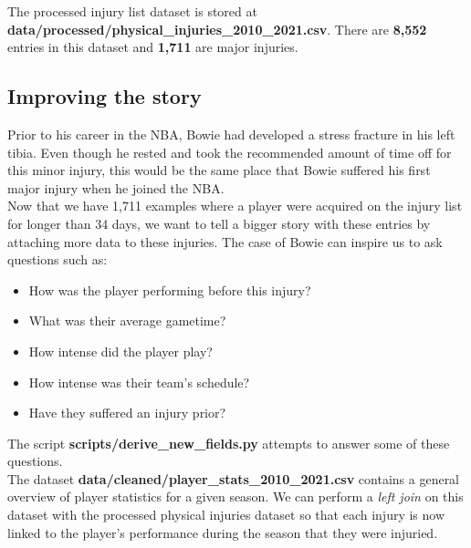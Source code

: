 \documentclass{article}
\begin{document}
The processed injury list dataset is stored at \textbf{data/processed/physical\_injuries\_2010\_2021.csv}.
There are \textbf{8,552} entries in this dataset and \textbf{1,711} are major injuries.

\subsection*{Improving the story}

Prior to his career in the NBA, Bowie had developed a stress fracture in his left tibia.
Even though he rested and took the recommended amount of time off for this minor injury,
this would be the same place that Bowie suffered his first major injury when he joined the NBA.\\

Now that we have 1,711 examples where a player were acquired on the injury list
for longer than 34 days, we want to tell a bigger story with these entries by attaching
more data to these injuries. The case of Bowie can inspire us to ask questions such as:

\begin{itemize}
    \item How was the player performing before this injury?
    \item What was their average gametime?
    \item How intense did the player play?
    \item How intense was their team's schedule?
    \item Have they suffered an injury prior?
\end{itemize}

The script \textbf{scripts/derive\_new\_fields.py} attempts to answer some of these questions.\\

The dataset \textbf{data/cleaned/player\_stats\_2010\_2021.csv} contains a general overview of player
statistics for a given season. We can perform a \emph{left join} on this dataset with the processed
physical injuries dataset so that each injury is now linked to the player's performance during
the season that they were injuried.\\
\newpage
\end{document}
